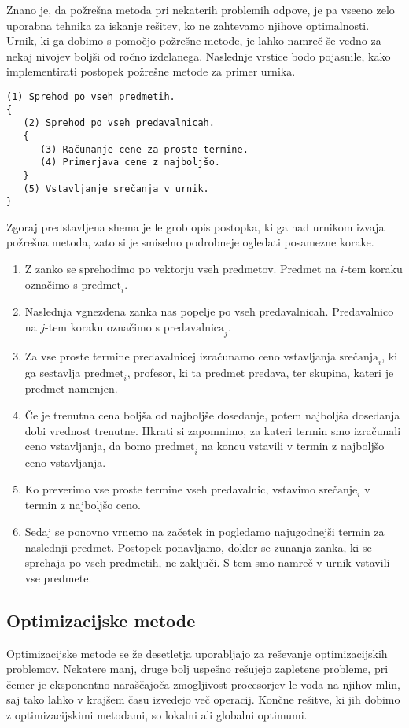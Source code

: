 \documentclass[10pt, a4paper]{article}
\begin{document}
Znano je, da požrešna metoda pri nekaterih problemih odpove, je pa vseeno zelo uporabna
tehnika za iskanje rešitev, ko ne zahtevamo njihove optimalnosti. Urnik, ki ga dobimo s
pomočjo požrešne metode, je lahko namreč še vedno za nekaj nivojev boljši od ročno izdelanega.
Naslednje vrstice bodo pojasnile, kako implementirati postopek požrešne metode za primer urnika.
\begin{verbatim}
(1) Sprehod po vseh predmetih.
{
   (2) Sprehod po vseh predavalnicah.
   {
      (3) Računanje cene za proste termine.
      (4) Primerjava cene z najboljšo.
   }
   (5) Vstavljanje srečanja v urnik.
}
\end{verbatim}
Zgoraj predstavljena shema je le grob opis postopka, ki ga nad urnikom izvaja požrešna metoda,
zato si je smiselno podrobneje ogledati posamezne korake.
\begin{enumerate}
   \item
      Z zanko se sprehodimo po vektorju vseh predmetov. Predmet na $i$-tem koraku
      označimo s $\text{predmet}_i$.
   \item
      Naslednja vgnezdena zanka nas popelje po vseh predavalnicah. Predavalnico na
      $j$-tem koraku označimo s $\text{predavalnica}_j$.
   \item
      Za vse proste termine predavalnicej izračunamo ceno vstavljanja
      $\text{srečanja}_i$, ki ga sestavlja $\text{predmet}_i$, profesor, ki ta predmet predava,
      ter skupina, kateri je predmet namenjen.
   \item
      Če je trenutna cena boljša od najboljše dosedanje, potem najboljša dosedanja
      dobi vrednost trenutne. Hkrati si zapomnimo, za kateri termin smo izračunali ceno
      vstavljanja, da bomo $\text{predmet}_i$ na koncu vstavili v termin z najboljšo
      ceno vstavljanja.
   \item
      Ko preverimo vse proste termine vseh predavalnic, vstavimo $\text{srečanje}_i$
      v termin z najboljšo ceno.
   \item
      Sedaj se ponovno vrnemo na začetek in pogledamo najugodnejši termin za naslednji
      predmet. Postopek ponavljamo, dokler se zunanja zanka, ki se sprehaja po vseh predmetih,
      ne zaključi. S tem smo namreč v urnik vstavili vse predmete.
\end{enumerate}
\subsection{Optimizacijske metode}

Optimizacijske metode se že desetletja uporabljajo za reševanje optimizacijskih problemov.
Nekatere manj, druge bolj uspešno rešujejo zapletene probleme, pri čemer je eksponentno
naraščajoča zmogljivost procesorjev le voda na njihov mlin, saj tako lahko v krajšem
času izvedejo več operacij. Končne rešitve, ki jih dobimo z optimizacijskimi metodami,
so lokalni ali globalni optimumi.
\end{document}
